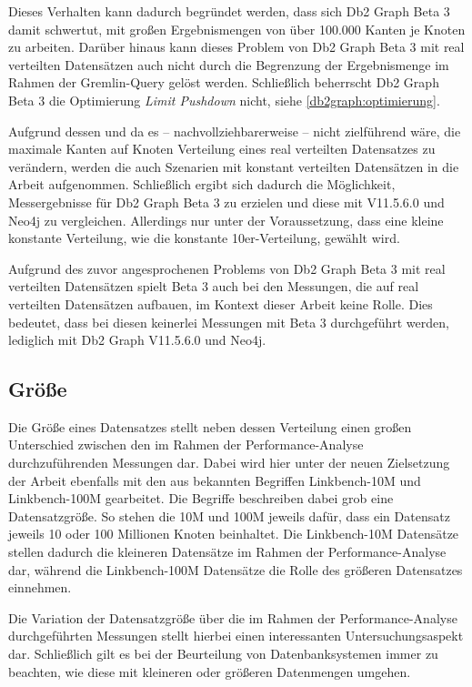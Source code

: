 Dieses Verhalten kann dadurch begründet werden, dass sich Db2 Graph Beta 3 damit schwertut, mit großen Ergebnismengen von über 100.000 Kanten je Knoten zu arbeiten. Darüber hinaus kann dieses Problem von Db2 Graph Beta 3 mit real verteilten Datensätzen auch nicht durch die Begrenzung der Ergebnismenge im Rahmen der Gremlin-Query gelöst werden. Schließlich beherrscht Db2 Graph Beta 3 die Optimierung \textit{Limit Pushdown} nicht, siehe \autoref{db2graph:optimierung}. 

Aufgrund dessen und da es -- nachvollziehbarerweise -- nicht zielführend wäre, die maximale Kanten auf Knoten Verteilung eines real verteilten Datensatzes zu verändern, werden die auch Szenarien mit konstant verteilten Datensätzen in die Arbeit aufgenommen. Schließlich ergibt sich dadurch die Möglichkeit, Messergebnisse für Db2 Graph Beta 3 zu erzielen und diese mit V11.5.6.0 und Neo4j zu vergleichen. Allerdings nur unter der Voraussetzung, dass eine kleine konstante Verteilung, wie die konstante 10er-Verteilung, gewählt wird. 

Aufgrund des zuvor angesprochenen Problems von Db2 Graph Beta 3 mit real verteilten Datensätzen spielt Beta 3 auch bei den Messungen, die auf real verteilten Datensätzen aufbauen, im Kontext dieser Arbeit keine Rolle. Dies bedeutet, dass bei diesen keinerlei Messungen mit Beta 3 durchgeführt werden, lediglich mit Db2 Graph V11.5.6.0 und Neo4j. 

\subsection{Größe}
Die Größe eines Datensatzes stellt neben dessen Verteilung einen großen Unterschied zwischen den im Rahmen der Performance-Analyse durchzuführenden Messungen dar. Dabei wird hier unter der neuen Zielsetzung der Arbeit ebenfalls mit den aus \cite{sigmod_tian} bekannten Begriffen Linkbench-10M und Linkbench-100M gearbeitet. Die Begriffe beschreiben dabei grob eine Datensatzgröße. So stehen die 10M und 100M jeweils dafür, dass ein Datensatz jeweils 10 oder 100 Millionen Knoten beinhaltet. Die Linkbench-10M Datensätze stellen dadurch die kleineren Datensätze im Rahmen der Performance-Analyse dar, während die Linkbench-100M Datensätze die Rolle des größeren Datensatzes einnehmen. 

Die Variation der Datensatzgröße über die im Rahmen der Performance-Analyse durchgeführten Messungen stellt hierbei einen interessanten Untersuchungsaspekt dar. Schließlich gilt es bei der Beurteilung von Datenbanksystemen immer zu beachten, wie diese mit kleineren oder größeren Datenmengen umgehen.

